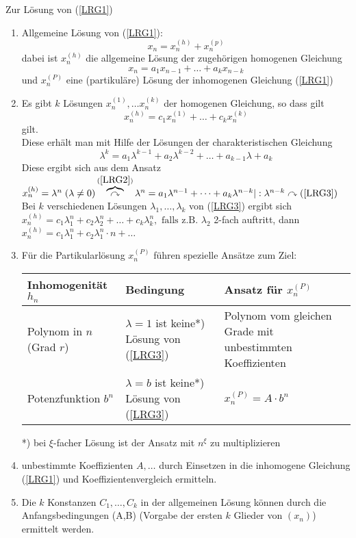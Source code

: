 \documentclass[a4paper]{scrartcl}
\begin{document}
Zur Lösung von (\ref{LRG1})
\begin{enumerate}
\item Allgemeine Lösung von (\ref{LRG1}): \[x_n = x_n^{(h)} + x_n^{(p)}\] dabei ist $x_n^{(h)}$ die allgemeine Lösung der zugehörigen homogenen Gleichung
\begin{equation}\label{LRG2} x_n = a_1 x_{n-1} + \dots + a_k x_{n-k} \end{equation} und $x_n^{(P)}$ eine (partikuläre) Lösung der inhomogenen Gleichung (\ref{LRG1})
\item Es gibt $k$ Lösungen $x_n^{(1)}, \dots x_n^{(k)}$ der homogenen Gleichung, so dass gilt
\[x_n^{(h)} = c_1 x_n^{(1)} + \dots + c_k x_n^{(k)} \] gilt.\\
Diese erhält man mit Hilfe der Lösungen der charakteristischen Gleichung \begin{equation}\label{LRG3} \lambda^k = a_1 \lambda^{k-1} + a_2 \lambda^{k-2} + \dots + a_{k-1} \lambda + a_k \end{equation}
Diese ergibt sich aus dem Ansatz $x_n^{(h)} = \lambda^n \; ( \lambda \neq 0) \overbrace{\curvearrowright}^{(\ref{LRG2})} \lambda^n = a_1 \lambda^{n-1} + \dots + a_k \lambda^{n-k} | : \lambda^{n-k} \curvearrowright (\ref{LRG3})$\\
Bei $k$ verschiedenen Lösungen $\lambda_1, \dots, \lambda_k$ von (\ref{LRG3}) ergibt sich $x_n^{(h)} = c_1 \lambda_1^n + c_2 \lambda_2^n + \dots + c_k \lambda_k^n, \text{ falls z.B. } \lambda_2$ 2-fach auftritt, dann $x_n^{(h)}  = c_1 \lambda_1^n + c_2 \lambda_1^n \cdot n + \dots$
\item Für die Partikularlösung $x_n^{(P)}$ führen spezielle Ansätze zum Ziel:\\
\begin{tabular}{l|p{3cm}|p{4cm}}
Inhomogenität $h_n$ & Bedingung & Ansatz für $x_n^{(P)}$ \\ \hline
Polynom in $n$ (Grad $r$) & $\lambda = 1$ ist keine*) Lösung von (\ref{LRG3}) & Polynom vom gleichen Grade mit unbestimmten Koeffizienten \\
Potenzfunktion $b^n$ & $\lambda = b$ ist keine*) Lösung von (\ref{LRG3}) & $x_n^{(P)} = A \cdot b^n$\\
\end{tabular}
*) bei $\xi$-facher Lösung ist der Ansatz mit $n^\xi$ zu multiplizieren
\item unbestimmte Koeffizienten $A,\dots$ durch Einsetzen in die inhomogene Gleichung (\ref{LRG1}) und Koeffizientenvergleich ermitteln.
\item Die $k$ Konstanzen $C_1,\dots,C_k$ in der allgemeinen Lösung können durch die Anfangsbedingungen (A,B) (Vorgabe der ersten $k$ Glieder von $(x_n)$) ermittelt werden.
\end{enumerate}
\end{document}

